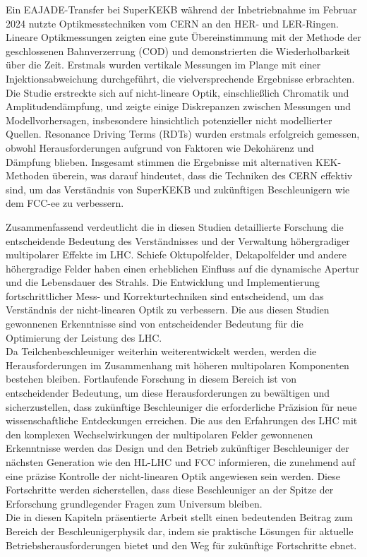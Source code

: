 {%
Ein EAJADE-Transfer bei SuperKEKB während der Inbetriebnahme im Februar 2024 nutzte Optikmesstechniken vom CERN an den HER- und LER-Ringen. Lineare Optikmessungen zeigten eine gute Übereinstimmung mit der Methode der geschlossenen Bahnverzerrung (COD) und demonstrierten die Wiederholbarkeit über die Zeit. Erstmals wurden vertikale Messungen im Plange mit einer Injektionsabweichung durchgeführt, die vielversprechende Ergebnisse erbrachten. Die Studie erstreckte sich auf nicht-lineare Optik, einschließlich Chromatik und Amplitudendämpfung, und zeigte einige Diskrepanzen zwischen Messungen und Modellvorhersagen, insbesondere hinsichtlich potenzieller nicht modellierter Quellen. Resonance Driving Terms (RDTs) wurden erstmals erfolgreich gemessen, obwohl Herausforderungen aufgrund von Faktoren wie Dekohärenz und Dämpfung blieben. Insgesamt stimmen die Ergebnisse mit alternativen KEK-Methoden überein, was darauf hindeutet, dass die Techniken des CERN effektiv sind, um das Verständnis von SuperKEKB und zukünftigen Beschleunigern wie dem FCC-ee zu verbessern.

Zusammenfassend verdeutlicht die in diesen Studien detaillierte Forschung die entscheidende Bedeutung des Verständnisses und der Verwaltung höhergradiger multipolarer Effekte im LHC. Schiefe Oktupolfelder, Dekapolfelder und andere höhergradige Felder haben einen erheblichen Einfluss auf die dynamische Apertur und die Lebensdauer des Strahls. Die Entwicklung und Implementierung fortschrittlicher Mess- und Korrekturtechniken sind entscheidend, um das Verständnis der nicht-linearen Optik zu verbessern. Die aus diesen Studien gewonnenen Erkenntnisse sind von entscheidender Bedeutung für die Optimierung der Leistung des LHC.
\\
\indent
Da Teilchenbeschleuniger weiterhin weiterentwickelt werden, werden die Herausforderungen im Zusammenhang mit höheren multipolaren Komponenten bestehen bleiben. Fortlaufende Forschung in diesem Bereich ist von entscheidender Bedeutung, um diese Herausforderungen zu bewältigen und sicherzustellen, dass zukünftige Beschleuniger die erforderliche Präzision für neue wissenschaftliche Entdeckungen erreichen. Die aus den Erfahrungen des LHC mit den komplexen Wechselwirkungen der multipolaren Felder gewonnenen Erkenntnisse werden das Design und den Betrieb zukünftiger Beschleuniger der nächsten Generation wie den HL-LHC und FCC informieren, die zunehmend auf eine präzise Kontrolle der nicht-linearen Optik angewiesen sein werden. Diese Fortschritte werden sicherstellen, dass diese Beschleuniger an der Spitze der Erforschung grundlegender Fragen zum Universum bleiben.
\\
\indent
Die in diesen Kapiteln präsentierte Arbeit stellt einen bedeutenden Beitrag zum Bereich der Beschleunigerphysik dar, indem sie praktische Lösungen für aktuelle Betriebsherausforderungen bietet und den Weg für zukünftige Fortschritte ebnet.


}